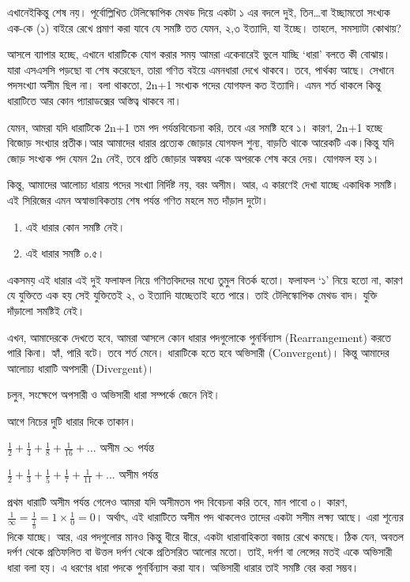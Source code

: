 \documentclass[
]{book}
\providecommand{\tightlist}{%
  \setlength{\itemsep}{0pt}\setlength{\parskip}{0pt}}
\begin{document}
এখানেইকিন্তু শেষ নয়। পূর্বোল্লিখিত টেলিস্কোপিক মেথড দিয়ে একটা ১ এর বদলে দুই, তিন\ldots বা ইচ্ছামতো সংখ্যক এক-কে (১) বাইরে রেখে প্রমাণ করা যাবে যে সমষ্টি তত যেমন, ২,৩ ইত্যাদি, যা ইচ্ছে। তাহলে, সমস্যাটা কোথায়?

আসলে ব্যাপার হচ্ছে, এখানে ধারাটিকে যোগ করার সময় আমরা একেবারেই ভুলে যাচ্ছি `ধারা' বলতে কী বোঝায়। যারা এসএসসি পড়ছো বা শেষ করেছেন, তারা গণিত বইয়ে এমনধারা দেখে থাকবে। তবে, পার্থক্য আছে। সেখানে পদসংখ্যা অসীম ছিল না। বলা থাকতো, 2n+1 সংখ্যক পদের যোগফল কত ইত্যাদি। এমন শর্ত থাকলে কিন্তু ধারাটিতে আর কোন প্যারাডক্সের অস্তিত্ব থাকবে না।

যেমন, আমরা যদি ধারাটিকে 2n+1 তম পদ পর্যন্তবিবেচনা করি, তবে এর সমষ্টি হবে ১। কারণ, 2n+1 হচ্ছে বিজোড় সংখ্যার প্রতীক।আর আমাদের ধারার প্রত্যেক জোড়ার যোগফল শুন্য, বাড়তি থাকে আরেকটি এক।কিন্তু যদি জোড় সংখ্যক পদ যেমন 2n নেই, তবে প্রতি জোড়ার অঙ্কদ্বয় একে অপরকে শেষ করে দেয়। যোগফল হয় ১।

কিন্তু, আমাদের আলোচ্য ধারায় পদের সংখ্যা নির্দিষ্ট নয়, বরং অসীম। আর, এ কারণেই দেখা যাচ্ছে একাধিক সমষ্টি।
এই সিরিজের এমন অস্বাভাবিকতায় শেষ পর্যন্ত গণিত মহলে মত দাঁড়াল দুটো।

\begin{enumerate}
\def\labelenumi{\arabic{enumi}.}
\tightlist
\item
  এই ধারার কোন সমষ্টি নেই।
\item
  এই ধারার সমষ্টি ০.৫।
\end{enumerate}

একসময় এই ধারার এই দুই ফলাফল নিয়ে গণিতবিদদের মধ্যে তুমুল বিতর্ক হতো। ফলাফল `১' নিয়ে হতো না, কারণ যে যুক্তিতে এক হয় সেই যুক্তিতেই ২, ৩ ইত্যাদি যাচ্ছেতাই হতে পারে। তাই টেলিস্কোপিক মেথড বাদ। যুক্তি দাঁড়ালো সমষ্টিই নেই।

এখন, আমাদেরকে দেখতে হবে, আমরা আসলে কোন ধারার পদগুলোকে পুনর্বিন্যাস (Rearrangement) করতে পারি কিনা। হ্যাঁ, পারি বটে। তবে শর্ত মেনে। ধারাটিকে হতে হবে অভিসারী (Convergent)। কিন্তু আমাদের আলোচ্য ধারাটি অপসারী (Divergent)।

চলুন, সংক্ষেপে অপসারী ও অভিসারী ধারা সম্পর্কে জেনে নিই।

আগে নিচের দুটি ধারার দিকে তাকান।

\(\frac 1 2 + \frac 1 4 + \frac 1 8 + \frac 1 {16} + ...\) অসীম \(\infty\) পর্যন্ত

\(\frac 1 2 + \frac 1 3 + \frac 1 5 + \frac 1 7 + \frac 1 {11} + ...\) অসীম পর্যন্ত

প্রথম ধারাটি অসীম পর্যন্ত গেলেও আমরা যদি অসীমতম পদ বিবেচনা করি তবে, মান পাবো ০। কারণ, \(\frac{1}{\infty}=\frac 1 {\frac{1}{0}}=1 \times \frac{1}{0}=0\)। অর্থাৎ, এই ধারাটিতে অসীম পদ থাকলেও তাদের একটা সসীম লক্ষ্য আছে। এরা শূন্যের দিকে যাচ্ছে। আর, এর পদগুলোর মানও কিন্তু ধীরে ধীরে, একটা ধারাবাহিকতা বজায় রেখে কমছে। ঠিক যেন, অবতল দর্পণ থেকে প্রতিফলিত বা উত্তল দর্পণ থেকে প্রতিসরিত আলোর মতো। তাই, দর্পণ বা লেন্সের মতই একে অভিসারী ধারা বলা হয়। এ ধরণের ধারা পদকে পুনর্বিন্যাস করা যাব। অভিসারী ধারার তাই সমষ্টি বের করা সম্ভব।
\end{document}

